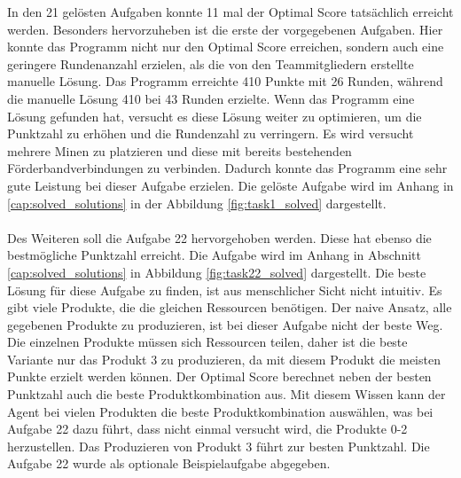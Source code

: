 In den 21 gelösten Aufgaben konnte 11 mal der Optimal Score tatsächlich erreicht werden. Besonders hervorzuheben ist die erste der vorgegebenen Aufgaben.  Hier konnte das Programm nicht nur den Optimal Score erreichen, sondern auch eine geringere Rundenanzahl erzielen, als die von den Teammitgliedern erstellte manuelle Lösung. Das Programm erreichte 410 Punkte mit 26 Runden, während die manuelle Lösung 410 bei 43 Runden erzielte. Wenn das Programm eine Lösung gefunden hat, versucht es diese Lösung weiter zu optimieren, um die Punktzahl zu erhöhen und die Rundenzahl zu verringern. Es wird versucht mehrere Minen zu platzieren und diese mit bereits bestehenden Förderbandverbindungen zu verbinden. Dadurch konnte das Programm eine sehr gute Leistung bei dieser Aufgabe erzielen.
Die gelöste Aufgabe wird im Anhang in \ref{cap:solved_solutions} in der Abbildung \ref{fig:task1_solved} dargestellt.
\\\\
Des Weiteren soll die Aufgabe 22 hervorgehoben werden.  Diese hat ebenso die bestmögliche Punktzahl erreicht. Die Aufgabe wird im Anhang in Abschnitt \ref{cap:solved_solutions} in Abbildung \ref{fig:task22_solved} dargestellt. Die beste Lösung für diese Aufgabe zu finden, ist aus menschlicher Sicht nicht intuitiv. Es gibt viele Produkte, die die gleichen Ressourcen benötigen. Der naive Ansatz, alle gegebenen Produkte zu produzieren, ist bei dieser Aufgabe nicht der beste Weg. Die einzelnen Produkte müssen sich Ressourcen teilen, daher ist die beste Variante nur das Produkt 3 zu produzieren, da mit diesem Produkt die meisten Punkte erzielt werden können. Der Optimal Score berechnet neben der besten Punktzahl auch die beste Produktkombination aus. Mit diesem Wissen kann der Agent bei vielen Produkten die beste Produktkombination auswählen, was bei Aufgabe 22 dazu führt, dass nicht einmal versucht wird, die Produkte 0-2 herzustellen. Das Produzieren von Produkt 3 führt zur besten Punktzahl. Die Aufgabe 22 wurde als optionale Beispielaufgabe abgegeben.
\\\\

